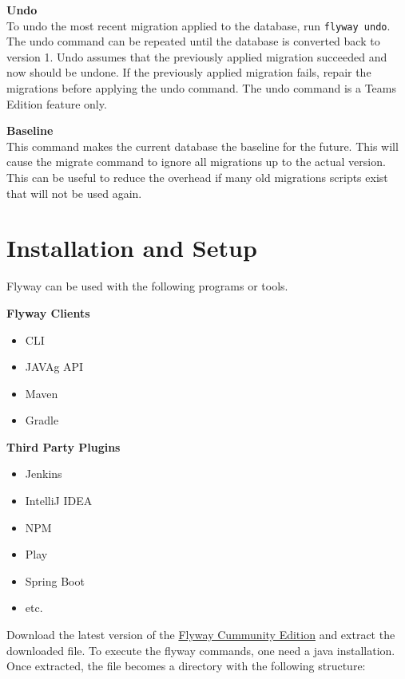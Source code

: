 \textbf{Undo}\\
To undo the most recent migration applied to the database, run \texttt{flyway undo}. The undo command can be repeated until the database is converted back to version 1. Undo assumes that the previously applied migration succeeded and now should be undone. If the previously applied migration fails, repair the migrations before applying the undo command. The undo command is a Teams Edition feature only.

\textbf{Baseline}\\
This command makes the current database the baseline for the future. This will cause the migrate command to ignore all migrations up to the actual version. This can be useful to reduce the overhead if many old migrations scripts exist that will not be used again.

\section{Installation and Setup}
%
Flyway can be used with the following programs or tools.

\begin{minipage}[t]{0.5\textwidth}
\textbf{Flyway Clients}

\begin{itemize}
	\item \Gls{CLI}
	\item \gls{JAVAg} \acrshort{API}
	\item Maven
	\item Gradle
\end{itemize}
\end{minipage}
\begin{minipage}[t]{0.5\textwidth}
	\textbf{Third Party Plugins}
	\begin{itemize}
		\item Jenkins
		\item IntelliJ IDEA
		\item NPM
		\item Play
		\item Spring Boot
		\item etc.
	\end{itemize}
\end{minipage}
\vspace{0.3cm}

%
Download the latest version of the \href{https://flywaydb.org/download/community}{Flyway Cummunity Edition} and extract the downloaded file. To execute the flyway commands, one need a java installation.
Once extracted, the file becomes a directory with the following structure:

